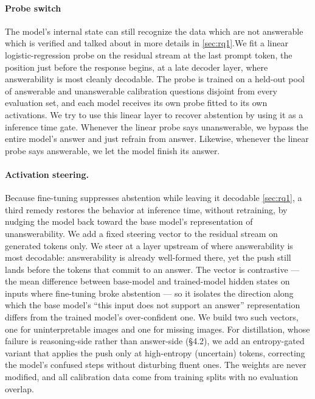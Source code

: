 \documentclass[10pt,twocolumn,letterpaper]{article}
\begin{document}
\paragraph{Probe switch}

 The model's internal state can still recognize the data which are not answerable which is verified and talked about in more details in \cref{sec:rq1}.We fit a linear logistic-regression probe on the residual stream at the last prompt token, the position just before the response begins, at a late decoder layer, where answerability is most cleanly decodable. The probe is trained on a held-out pool of answerable and unanswerable calibration questions disjoint from every evaluation set, and each model receives its own probe fitted to its own activations. We try to use this linear layer to recover abstention by using it as a inference time gate. Whenever the linear probe says unanswerable, we bypass the entire model's answer and just refrain from answer. Likewise, whenever the linear probe says answerable, we let the model finish its answer. 

\paragraph{Activation steering.}
Because fine-tuning suppresses abstention while leaving it decodable \cref{sec:rq1}, a third remedy restores the behavior at inference time, without retraining, by nudging the model back toward the base model’s representation of unanswerability. We add a fixed steering vector to the residual stream on generated tokens only. We steer at a layer upstream of where answerability is most decodable: answerability is already well-formed there, yet the push still lands before the tokens that commit to an answer. The vector is contrastive — the mean difference between base-model and trained-model hidden states on inputs where fine-tuning broke abstention — so it isolates the direction along which the base model’s “this input does not support an answer” representation differs from the trained model’s over-confident one. We build two such vectors, one for uninterpretable images and one for missing images. For distillation, whose failure is reasoning-side rather than answer-side (§4.2), we add an entropy-gated variant that applies the push only at high-entropy (uncertain) tokens, correcting the model’s confused steps without disturbing fluent ones. The weights are never modified, and all calibration data come from training splits with no evaluation overlap.
\end{document}
